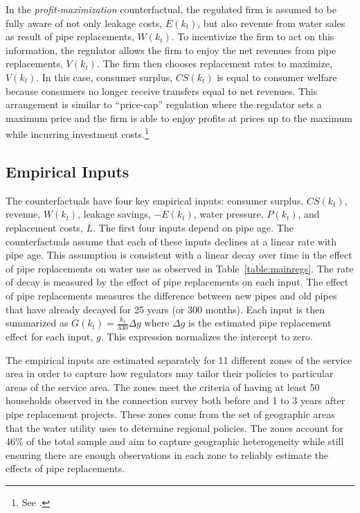 \documentclass[12pt,table]{article}
\begin{document}
In the \textit{profit-maximization} counterfactual, the regulated firm is assumed to be fully aware of not only leakage costs, $E(k_t)$, but also revenue from water sales as result of pipe replacements, $W(k_t)$.  To incentivize the firm to act on this information, the regulator allows the firm to enjoy the net revenues from pipe replacements, $V(k_t)$.  The firm then chooses replacement rates to maximize, $V(k_t)$.  In this case, consumer surplus, $CS(k_t)$ is equal to consumer welfare because consumers no longer receive transfers equal to net revenues.  This arrangement is similar to ``price-cap'' regulation where the regulator sets a maximum price and the firm is able to enjoy profits at prices up to the maximum while incurring investment costs.\footnote{See \cite{joskow2007regulation}.}


\subsection{Empirical Inputs}\label{section:counterinputs}

The counterfactuals have four key empirical inputs: consumer surplus, $CS(k_t)$, revenue, $W(k_{t})$, leakage savings, $-E(k_{t})$, water pressure, $P(k_t)$, and replacement costs, $\overline{L}$.  The first four inputs depend on pipe age.  The counterfactuals assume that each of these inputs declines at a linear rate with pipe age.  This assumption is consistent with a linear decay over time in the effect of pipe replacements on water use as observed in Table~\ref{table:mainregs}.  The rate of decay is measured by the effect of pipe replacements on each input.  The effect of pipe replacements measures the difference between new pipes and old pipes that have already decayed for 25 years (or 300 months).  Each input is then summarized as $G(k_t) = \frac{k_t}{330}\Delta g$ where $\Delta g$ is the estimated pipe replacement effect for each input, $g$.  This expression normalizes the intercept to zero.


The empirical inputs are estimated separately for 11 different zones of the service area in order to capture how regulators may tailor their policies to particular areas of the service area.  The zones meet the criteria of having at least 50 households observed in the connection survey both before and 1 to 3 years after pipe replacement projects.  These zones come from the set of geographic areas that the water utility uses to determine regional policies.  The zones account for 46\% of the total sample and aim to capture geographic heterogeneity while still ensuring there are enough observations in each zone to reliably estimate the effects of pipe replacements. %
\end{document}
